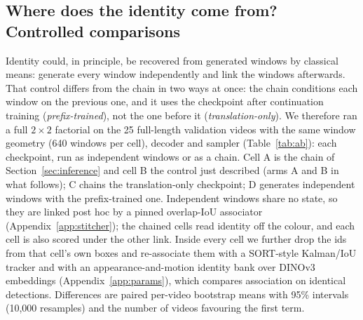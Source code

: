 \documentclass{article} %
\newcommand{\rev}[1]{#1}
\begin{document}
\subsection{Where does the identity come from? Controlled comparisons}
\label{sec:ab}

Identity could, in principle, be recovered from generated windows by classical means\rev{:
generate every window independently and link the windows afterwards. That control differs
from the chain in two ways at once: the chain conditions each window on the previous one,
and it uses the checkpoint after continuation training (\emph{prefix-trained}), not the one
before it (\emph{translation-only}). We therefore ran a full $2\times2$ factorial on the 25
full-length validation videos with the same window geometry (640 windows per cell), decoder
and sampler (Table~\ref{tab:ab}): each checkpoint, run as independent windows or as a
chain. Cell A is the chain of Section~\ref{sec:inference} and cell B the control just
described (arms A and B in what follows); C chains the translation-only checkpoint; D
generates independent windows with the prefix-trained one. Independent windows share no state, so they are linked
post hoc by a pinned overlap-IoU associator (Appendix~\ref{app:stitcher}); the chained cells
read identity off the colour, and each cell is also scored under the other link. Inside
every cell we further drop the ids from that cell's own boxes and re-associate them with a
SORT-style Kalman/IoU tracker \citep{bewley2016sort} and with an appearance-and-motion
identity bank over DINOv3 embeddings (Appendix~\ref{app:params}), which compares
association on identical detections. Differences are paired per-video bootstrap means with
95\% intervals (10,000 resamples) and the number of videos favouring the first term.}
\end{document}
